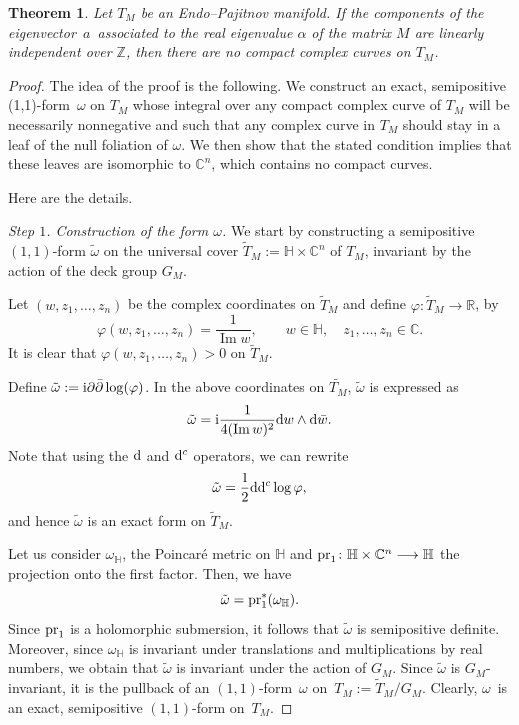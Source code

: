 \documentclass[pdftex]{sigma}
\newcommand{\C}{{\mathbb C}}
\renewcommand{\H}{{\mathbb H}}
\newcommand{\6}{\partial}
\renewcommand{\Im}{\operatorname{Im}}
\numberwithin{equation}{section}
\newtheorem{Theorem}{Theorem}[section]
\begin{document}
\begin{Theorem}\label{th_main}
Let $T_M$ be an Endo--Pajitnov manifold. If the components of the eigenvector~$a$~associated to the real eigenvalue $\alpha$ of the matrix $M$ are linearly independent over $\mathbb{Z}$, then there are no compact complex curves on $T_M$.
\end{Theorem}

\begin{proof}
The idea of the proof is the following. We construct an exact, semipositive (1,1)-form~$\omega$ on $T_M$ whose integral over any compact complex curve of $T_M$ will be necessarily nonnegative and such that any complex curve in $T_M$ should stay in a leaf of the null foliation of $\omega$. We then show that the stated condition implies that these leaves are isomorphic to $\mathbb{C}^n$, which contains no compact curves.

Here are the details.

{\it Step $1$. Construction of the form $\omega$.} We start by constructing a semipositive $(1,1)$-form $\tilde \omega$ on the universal cover $\tilde T_M:=\mathbb{H} \times \mathbb{C}^n$ of $T_M$, invariant by the action of the deck group $G_M$.

Let $(w, z_1, \dots, z_n)$ be the complex coordinates on $\tilde T_M$ and define $\varphi\colon \tilde T_M \longrightarrow \mathbb{R}$, by
\begin{equation*}
\varphi(w,z_1, \dots, z_n)=\frac{1}{\Im w}, \qquad w \in \mathbb{H}, \quad z_1, \dots, z_n \in \mathbb{C}.
\end{equation*}
It is clear that $\varphi(w,z_1, \dots, z_n)>0$ on $\tilde T_M $.

Define $\tilde{\omega}:=\mathrm{i} \6\Bar{\6} \log(\varphi)$.
In the above coordinates on $\tilde{T_M}$, $\tilde \omega$ is expressed as
\[\tilde{\omega}=\mathrm{i} \frac{1}{4(\Im w)^2} {\rm d}w \wedge {\rm d}\Bar{w}.\]
Note that using the ${\rm d}$ and ${\rm d}^c$ operators, we can rewrite
\[\tilde{\omega}=\frac{1}{2}{\rm d} {\rm d}^c \log \varphi,\]
and hence $\tilde{\omega}$ is an exact form on $\tilde T_M$.

Let us consider $\omega_\H$, the Poincar\'e metric on $\H$ and ${\rm pr}_1\colon \H \times \C^n \longrightarrow \H$ the projection onto the first factor. Then, we have
\begin{equation*}
 \tilde \omega={\rm pr}_1^*(\omega_\H).
\end{equation*}
Since ${\rm pr}_1$ is a holomorphic submersion, it follows that $\tilde \omega$ is semipositive definite.
Moreover, since $\omega_\H$ is invariant under translations and multiplications by real numbers, we obtain that $\tilde \omega$ is invariant under the action of $G_M$.
 Since $\tilde{\omega}$ is $G_M$-invariant, it is the pullback of an $(1,1)$-form~$\omega$ on~$T_M:= \tilde T_M/G_M$. Clearly, $\omega$~is an exact, semipositive $(1,1)$-form on~$T_M$.



\end{proof}
\end{document}
